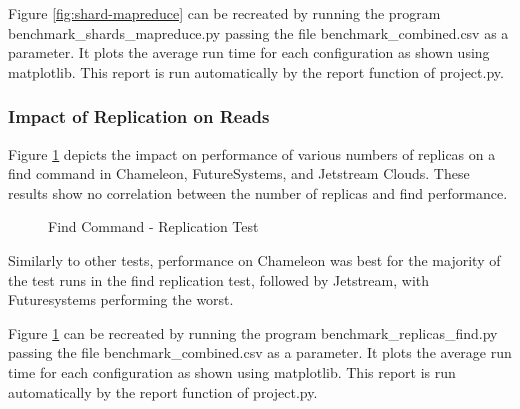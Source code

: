 \documentclass[sigconf]{acmart}
\begin{document}
Figure \ref{fig:shard-mapreduce} can be recreated by running the program benchmark\_shards\_mapreduce.py passing the file benchmark\_combined.csv as a parameter.  It plots the average run time for each configuration as shown using matplotlib. This report is run automatically by the report function of project.py.

\subsubsection{Impact of Replication on Reads}



Figure \ref{fig:replica-find} depicts the impact on performance of various numbers of replicas on a find command in Chameleon, FutureSystems, and Jetstream Clouds.  These results show no correlation between the number of replicas and find performance.

\begin{figure}[htbp]
\centering
{}
\caption{Find Command - Replication Test}
\label{fig:replica-find}
\end{figure}

Similarly to other tests, performance on Chameleon was best for the majority of the test runs in the find replication test, followed by Jetstream, with Futuresystems performing the worst.

Figure \ref{fig:replica-find} can be recreated by running the program benchmark\_replicas\_find.py passing the file benchmark\_combined.csv as a parameter.  It plots the average run time for each configuration as shown using matplotlib. This report is run automatically by the report function of project.py.
\end{document}

